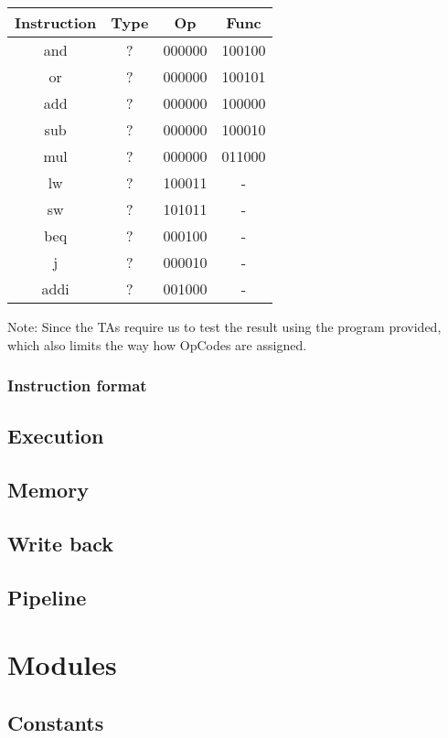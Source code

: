 \documentclass[11pt, a4paper, twoside]{IEEEtran}
\begin{document}
\begin{table}[h]
	\centering
	\begin{tabular}{|c|ccc|}
	\hline
    Instruction & Type & Op & Func\\
    \hline
    and & ? & 000000 & 100100 \\
    or & ? & 000000 & 100101 \\
    add & ? & 000000 & 100000 \\
    sub & ? & 000000 & 100010 \\
    mul & ? & 000000 & 011000 \\
    lw & ? & 100011 & - \\
    sw & ? & 101011 & - \\
    beq & ? & 000100 & - \\
    j & ? & 000010 & - \\
    addi & ? & 001000 & - \\
    \hline
	\end{tabular}
\end{table}

Note: Since the TAs require us to test the result using the program provided, which also limits the way how OpCodes are assigned.\\

\subsubsection{Instruction format}

\subsection{Execution}
\subsection{Memory}
\subsection{Write back}
\subsection{Pipeline}
	
\section{Modules}
\subsection{Constants}
\end{document}
